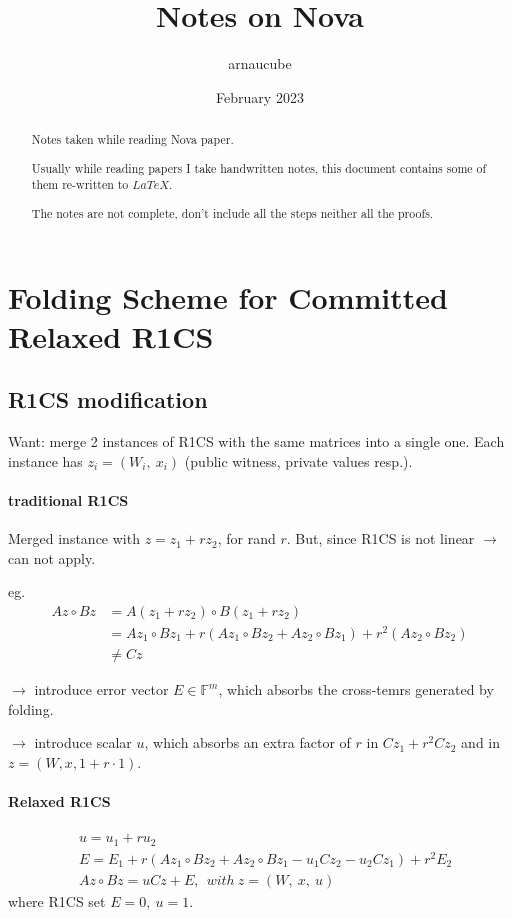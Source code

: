 \documentclass{article}
\title{Notes on Nova}
\author{arnaucube}
\date{February 2023}
\theoremstyle{definition}
\begin{document}
\maketitle

\begin{abstract}
	Notes taken while reading Nova \cite{cryptoeprint:2021/370} paper.

	Usually while reading papers I take handwritten notes, this document contains some of them re-written to $LaTeX$.

	The notes are not complete, don't include all the steps neither all the proofs.
\end{abstract}

\tableofcontents

\section{Folding Scheme for Committed Relaxed R1CS}

\subsection{R1CS modification}

Want: merge 2 instances of R1CS with the same matrices into a single one. Each instance has $z_i = (W_i,~ x_i)$ (public witness, private values resp.).

\paragraph{traditional R1CS}
Merged instance with $z=z_1 + r z_2$, for rand $r$. But, since R1CS is not linear $\longrightarrow$ can not apply.

eg.
\begin{align*}
	Az \circ Bz &= A(z_1 + r z_2) \circ B (z_1 + r z_2)\\
	&= A z_1 \circ B z_1 + r(A z_1 \circ B z_2 + A z_2 \circ B z_1) + r^2 (A z_2 \circ B z_2)\\
	&\neq Cz
\end{align*}

$\longrightarrow$ introduce error vector $E \in \mathbb{F}^m$, which absorbs the cross-temrs generated by folding.

$\longrightarrow$ introduce scalar $u$, which absorbs an extra factor of $r$ in $C z_1 + r^2 C z_2$ and in $z=(W, x, 1+r\cdot 1)$.

\paragraph{Relaxed R1CS}
\begin{align*}
	&u=u_1+r u_2\\
	&E=E_1 + r (A z_1 \circ B z_2 + A z_2 \circ B z_1 - u_1 C z_2 - u_2 C z_1) + r^2 E_2\\
	&Az \circ Bz = uCz + E,~~ with~ z=(W,~x,~u)
\end{align*}
where R1CS set $E=0,~u=1$.
\end{document}
